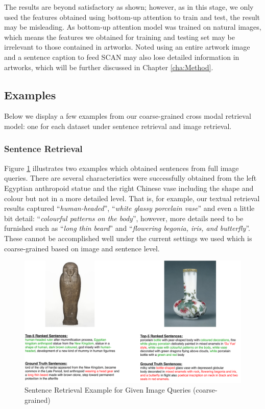 The results are beyond satisfactory as shown; however, as in this stage, we only used the features obtained using bottom-up attention \cite{bottomup} to train and test, the result may be misleading. As bottom-up attention model was trained on natural images, which means the features we obtained for training and testing set may be irrelevant to those contained in artworks. Noted using an entire artwork image and a sentence caption to feed SCAN may also lose detailed information in artworks, which will be further discussed in Chapter \ref{cha:Method}.

\subsection{Examples}
Below we display a few examples from our coarse-grained cross modal retrieval model: one for each dataset under sentence retrieval and image retrieval.

\subsubsection{Sentence Retrieval}
Figure \ref{fig:scani2t} illustrates two examples which obtained sentences from full image queries. There are several characteristics were successfully obtained from the left Egyptian anthropoid statue and the right Chinese vase including the shape and colour but not in a more detailed level. That is, for example, our textual retrieval results captured ``\textit{human-headed}'', ``\textit{white glassy porcelain vase}'' and even a little bit detail: ``\textit{colourful patterns on the body}'', however, more details need to be furnished such as ``\textit{long thin beard}'' and ``\textit{flowering begonia, iris, and butterfly}''. These cannot be accomplished well under the current settings we used which is coarse-grained based on image and sentence level.

\begin{figure}[h!]
\centering
\includegraphics[width=\textwidth]{scani2t.pdf}
\caption{Sentence Retrieval Example for Given Image Queries (coarse-grained)}
\label{fig:scani2t}
\end{figure}

